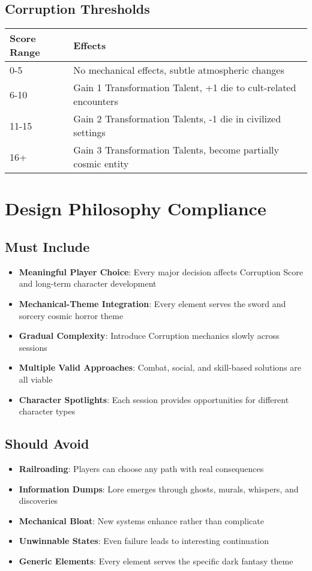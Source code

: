 \documentclass[11pt]{article}
\begin{document}
\subsection{Corruption Thresholds}
\begin{tabular}{|p{4cm}|p{8cm}|}
\hline
\textbf{Score Range} & \textbf{Effects} \\
\hline
0-5 & No mechanical effects, subtle atmospheric changes \\
\hline
6-10 & Gain 1 Transformation Talent, +1 die to cult-related encounters \\
\hline
11-15 & Gain 2 Transformation Talents, -1 die in civilized settings \\
\hline
16+ & Gain 3 Transformation Talents, become partially cosmic entity \\
\hline
\end{tabular}

\newpage

\section{Design Philosophy Compliance}

\subsection{Must Include}
\begin{itemize}[leftmargin=*]
    \item \textbf{Meaningful Player Choice}: Every major decision affects Corruption Score and long-term character development
    \item \textbf{Mechanical-Theme Integration}: Every element serves the sword and sorcery cosmic horror theme
    \item \textbf{Gradual Complexity}: Introduce Corruption mechanics slowly across sessions
    \item \textbf{Multiple Valid Approaches}: Combat, social, and skill-based solutions are all viable
    \item \textbf{Character Spotlights}: Each session provides opportunities for different character types
\end{itemize}

\subsection{Should Avoid}
\begin{itemize}[leftmargin=*]
    \item \textbf{Railroading}: Players can choose any path with real consequences
    \item \textbf{Information Dumps}: Lore emerges through ghosts, murals, whispers, and discoveries
    \item \textbf{Mechanical Bloat}: New systems enhance rather than complicate
    \item \textbf{Unwinnable States}: Even failure leads to interesting continuation
    \item \textbf{Generic Elements}: Every element serves the specific dark fantasy theme
\end{itemize}
\end{document}

